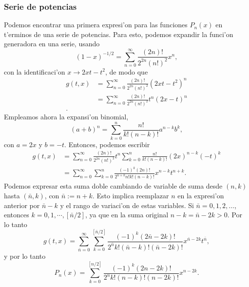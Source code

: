 \subsubsection{Serie de potencias}
Podemos encontrar una primera expresi'on para las funciones $P_n(x)$ en t'erminos de una serie de potencias. Para esto, podemos expandir la funci'on generadora en una serie, usando
\begin{equation}
(1-x)^{-1/2}=\sum_{n=0}^\infty\frac{(2n)!}{2^{2n}(n!)^2}x^n,
\end{equation}
con la identificaci'on $x\rightarrow 2xt-t^2$, de modo que
\begin{align}
g(t,x) &= \sum_{n=0}^\infty\frac{(2n)!}{2^{2n}(n!)^2}(2xt-t^2)^n \\
&= \sum_{n=0}^\infty\frac{(2n)!}{2^{2n}(n!)^2}t^n(2x-t)^n \\.
\end{align}
Empleamos ahora la expansi'on binomial,
\begin{equation}
(a+b)^n=\sum_{k=0}^n\frac{n!}{k!(n-k)!}a^{n-k}b^k,
\end{equation}
con $a=2x$ y $b=-t$. Entonces, podemos escribir
\begin{align}
g(t,x) 
&= \sum_{n=0}^\infty\frac{(2n)!}{2^{2n}(n!)^2}t^n \sum_{k=0}^n\frac{n!}{k!(n-k)!}(2x)^{n-k}(-t)^k\\
&= \sum_{n=0}^\infty\sum_{k=0}^n\frac{(-1)^k(2n)!}{2^{n+k}n!k!(n-k)!}x^{n-k}t^{n+k}.
\end{align}
Podemos expresar esta suma doble cambiando de variable de suma desde $(n,k)$ hasta $(\bar{n},k)$, con $\bar{n}:=n+k$. Esto implica reemplazar $n$ en la expresi'on anterior por $\bar{n}-k$ y el rango de variaci'on de estas variables. Si $\bar{n}=0,1,2,\dots$, entonces $k=0,1,\cdots,[\bar{n}/2]$, ya que en la suma original $n-k=\bar{n}-2k>0$. Por lo tanto
\begin{equation}
g(t,x)= \sum_{\bar{n}=0}^\infty\sum_{k=0}^{[\bar{n}/2]}\frac{(-1)^k(2\bar{n}-2k)!}{2^{\bar{n}}k!(\bar{n}-k)!(\bar{n}-2k)!} x^{\bar{n}-2k}t^{\bar{n}},
\end{equation}
y por lo tanto
\begin{equation}\label{seriePn}
P_n(x)= \sum_{k=0}^{[n/2]}\frac{(-1)^{k}(2n-2k)!}{2^nk!(n-k)!(n-2k)!}x^{n-2k}.
\end{equation}

